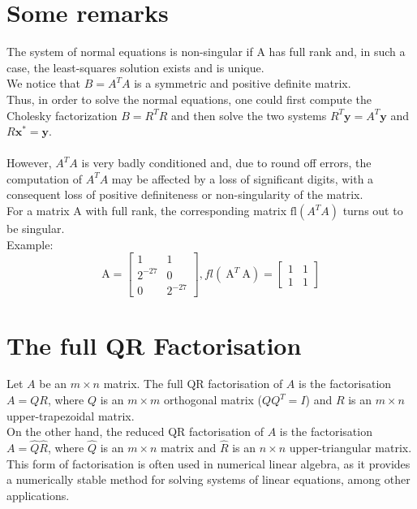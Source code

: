 \documentclass[11pt]{book}
\begin{document}
\section*{Some remarks}
The system of normal equations is non-singular if A has full rank and, in such a case, the least-squares solution exists and is unique.\\
We notice that $B=A^{T} A$ is a symmetric and positive definite matrix.\\
Thus, in order to solve the normal equations, one could first compute the Cholesky factorization $B=R^{T} R$ and then solve the two systems $R^{T} \mathbf{y}=A^{T} \mathbf{y} $ and $ R \mathbf{x}^{*}= \mathbf{y}$.\\ \\
However, $A^{T} A$ is very badly conditioned and, due to round off errors, the computation of $A^{T} A$ may be affected by a loss of significant digits, with a consequent loss of positive definiteness or non-singularity of the matrix.\\
For a matrix A with full rank, the corresponding matrix $\mathrm{fl}\left(A^{T} A\right)$ turns out to be singular.\\
Example:
$$
\mathrm{A}=\left[\begin{array}{cc}
1 & 1 \\
2^{-27} & 0 \\
0 & 2^{-27}
\end{array}\right], f l\left(\mathrm{~A}^{T} \mathrm{~A}\right)=\left[\begin{array}{ll}
1 & 1 \\
1 & 1
\end{array}\right]
$$



\section*{The full QR Factorisation}
Let $A$ be an $m \times n$ matrix. The full QR factorisation of $A$ is the factorisation $A=QR$, where $Q$ is an $m \times m$ orthogonal matrix ($QQ^{T}=I$) and $R$ is an $m \times n$ upper-trapezoidal matrix.\\
On the other hand, the reduced QR factorisation of $A$ is the factorisation $A=\hat{Q}\hat{R}$, where $\hat{Q}$ is an $m \times n$ matrix and $\hat{R}$ is an $n \times n$ upper-triangular matrix. This form of factorisation is often used in numerical linear algebra, as it provides a numerically stable method for solving systems of linear equations, among other applications.\\
\end{document}
